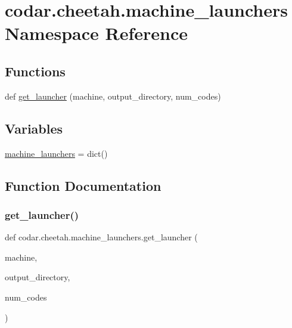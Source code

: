 \hypertarget{namespacecodar_1_1cheetah_1_1machine__launchers}{}\section{codar.\+cheetah.\+machine\+\_\+launchers Namespace Reference}
\label{namespacecodar_1_1cheetah_1_1machine__launchers}
\subsection*{Functions}
\begin{DoxyCompactItemize}
\item 
def \hyperlink{namespacecodar_1_1cheetah_1_1machine__launchers_aaff7bc70245dabdceb72e1888d6c55ac}{get\+\_\+launcher} (machine, output\+\_\+directory, num\+\_\+codes)
\end{DoxyCompactItemize}
\subsection*{Variables}
\begin{DoxyCompactItemize}
\item 
\hyperlink{namespacecodar_1_1cheetah_1_1machine__launchers_aa90f6d2c4c3292e2159f8a668c228257}{machine\+\_\+launchers} = dict()
\end{DoxyCompactItemize}


\subsection{Function Documentation}
\mbox{\label{namespacecodar_1_1cheetah_1_1machine__launchers_aaff7bc70245dabdceb72e1888d6c55ac}} 
\subsubsection{\texorpdfstring{get\+\_\+launcher()}{get\_launcher()}}
{\footnotesize\ttfamily def codar.\+cheetah.\+machine\+\_\+launchers.\+get\+\_\+launcher (\begin{DoxyParamCaption}\item[{}]{machine,  }\item[{}]{output\+\_\+directory,  }\item[{}]{num\+\_\+codes }\end{DoxyParamCaption})}



